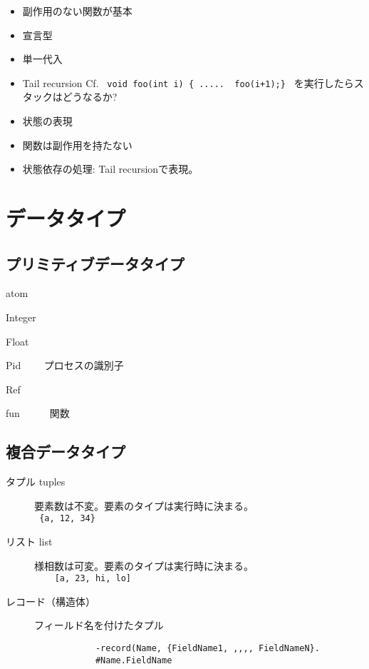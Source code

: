 \begin{itemize}
    \item  副作用のない関数が基本
    \item  宣言型
    \item  単一代入
    \item  Tail recursion
        Cf.   \verb| void foo(int i) { .....  foo(i+1);} | を実行したらスタックはどうなるか?
    
    \item  状態の表現
    \item  関数は副作用を持たない
   \item  状態依存の処理:  Tail recursionで表現。
\end{itemize}


\section{データタイプ}

\subsection{プリミティブデータタイプ}

       atom

       Integer

       Float

       Pid　　 プロセスの識別子

       Ref

       fun　　　関数　　
    
\subsection{複合データタイプ}


\begin{description}
    \item  [タプル  tuples]    要素数は不変。要素のタイプは実行時に決まる。\\
        \verb| {a, 12, 34} |
    \item  [リスト   list]     様相数は可変。要素のタイプは実行時に決まる。 \\
        \verb|    [a, 23, hi, lo] |
    \item  [レコード（構造体）]   フィールド名を付けたタプル
        \begin{verbatim}
            -record(Name, {FieldName1, ,,,, FieldNameN}.  
            #Name.FieldName   
        \end{verbatim}

\end{description}


